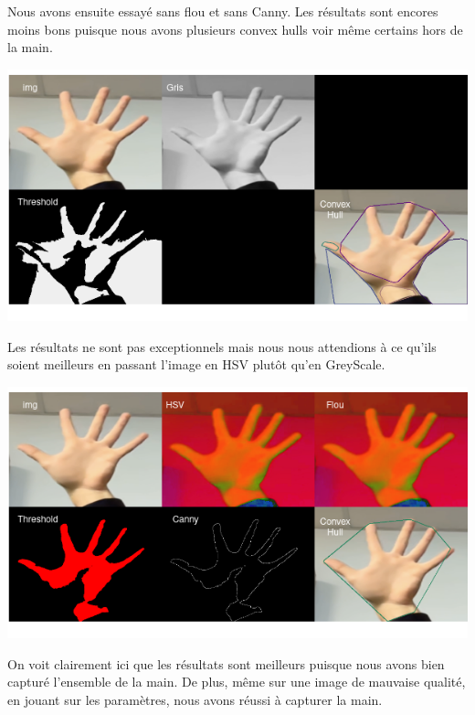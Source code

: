 \documentclass[11pt]{article}
\begin{document}
Nous avons ensuite essayé sans flou et sans Canny. Les résultats sont encores moins bons puisque nous avons plusieurs convex hulls voir même certains hors de la main. \bigbreak

\begin{center}
    \includegraphics[width=\textwidth]{images/pre_ttt_3.png}
\end{center}
\bigbreak

Les résultats ne sont pas exceptionnels mais nous nous attendions à ce qu'ils soient meilleurs en passant l'image en HSV plutôt qu'en GreyScale.  \bigbreak

\begin{center}
    \includegraphics[width=\textwidth]{images/pre_ttt_4.png}
\end{center}
\bigbreak

On voit clairement ici que les résultats sont meilleurs puisque nous avons bien capturé l'ensemble de la main. De plus, même sur une image de mauvaise qualité, en jouant sur les paramètres, nous avons réussi à capturer la main. \bigbreak
\end{document}

